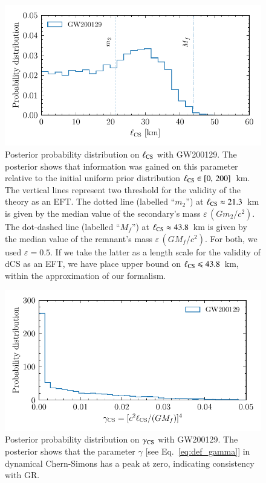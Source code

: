 \documentclass[twocolumn,prd,aps,superscriptaddress,preprintnumbers,tightenlines,showpacs,nofootinbib,eqsecnum,amsfonts,amsmath,longbibliography]{revtex4-1}
\begin{document}
\begin{figure}[t]
\includegraphics[width=\columnwidth]{figs/dcs_GW200129.pdf}
\caption{Posterior probability distribution on $\ell_{\rm CS}$ with GW200129.
The posterior shows that information was gained on this parameter relative to
the initial uniform prior distribution $\ell_{\rm CS} \in [0,\, 200]$~km.
%
The vertical lines represent two threshold for the validity of the theory as
an EFT.
%
The dotted line (labelled ``$m_2$'') at $\ell_{\rm CS} \approx 21.3$~km is
given by the median value of the secondary's mass $\varepsilon \, (G m_2 / c^2)$.
%
The dot-dashed line (labelled ``$M_{f}$'') at $\ell_{\rm CS} \approx 43.8$~km is
given by the median value of the remnant's mass $\varepsilon \, (G M_{f} / c^2)$.
%
For both, we used $\varepsilon = 0.5$.
%
If we take the latter as a length scale for the validity of dCS as an EFT, we
have place upper bound on $\ell_{\rm CS} \leqslant 43.8$~km, within the
approximation of our formalism.
}
\label{fig:dCS_bounds}
\end{figure}

\begin{figure}[t]
\includegraphics[width=\columnwidth]{figs/dcs_gamma_GW200129.pdf}
\caption{Posterior probability distribution on $\gamma_{\rm CS}$ with GW200129.
The posterior shows that the parameter $\gamma$ [see Eq.~\eqref{eq:def_gamma}]
in dynamical Chern-Simons has a peak at zero, indicating consistency with GR.
}
\label{fig:dCS_gamma_plot}
\end{figure}
\end{document}
